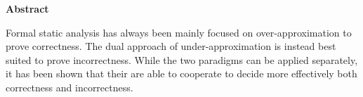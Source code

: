 \thispagestyle{plain}
\begin{center}
	\Large
	\textbf{Abstract}
\end{center}
Formal static analysis has always been mainly focused on over-approximation to prove correctness. The dual approach of under-approximation is instead best suited to prove incorrectness. While the two paradigms can be applied separately, it has been shown that their are able to cooperate to decide more effectively both correctness and incorrectness.
